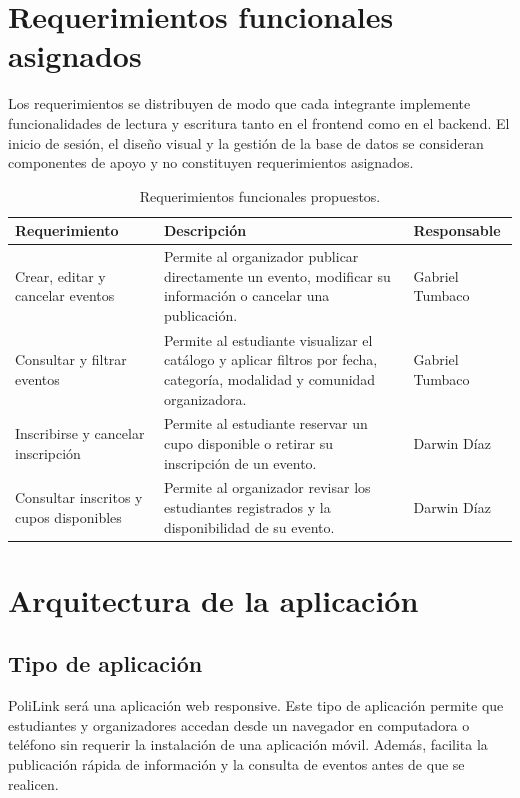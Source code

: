 \documentclass[12pt]{article}
\begin{document}
\section{Requerimientos funcionales asignados}

Los requerimientos se distribuyen de modo que cada integrante implemente funcionalidades de lectura y escritura tanto en el frontend como en el backend. El inicio de sesión, el diseño visual y la gestión de la base de datos se consideran componentes de apoyo y no constituyen requerimientos asignados.

\begin{table}[h!]
\centering
\small
\begin{tabularx}{\textwidth}{p{3.3cm}Yp{2.8cm}}
\toprule
\textbf{Requerimiento} & \textbf{Descripción} & \textbf{Responsable} \\
\midrule
Crear, editar y cancelar eventos & Permite al organizador publicar directamente un evento, modificar su información o cancelar una publicación. & Gabriel Tumbaco \\
Consultar y filtrar eventos & Permite al estudiante visualizar el catálogo y aplicar filtros por fecha, categoría, modalidad y comunidad organizadora. & Gabriel Tumbaco \\
Inscribirse y cancelar inscripción & Permite al estudiante reservar un cupo disponible o retirar su inscripción de un evento. & Darwin Díaz \\
Consultar inscritos y cupos disponibles & Permite al organizador revisar los estudiantes registrados y la disponibilidad de su evento. & Darwin Díaz \\
\bottomrule
\end{tabularx}
\caption{Requerimientos funcionales propuestos.}
\end{table}

\section{Arquitectura de la aplicación}

\subsection{Tipo de aplicación}

PoliLink será una aplicación web responsive. Este tipo de aplicación permite que estudiantes y organizadores accedan desde un navegador en computadora o teléfono sin requerir la instalación de una aplicación móvil. Además, facilita la publicación rápida de información y la consulta de eventos antes de que se realicen.
\end{document}
